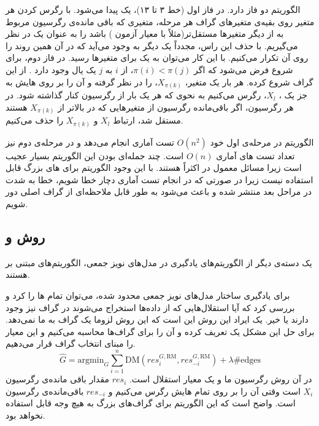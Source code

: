 \documentclass[a4paper,12pt]{article}
\def\hat{\widehat}
\begin{document}
الگوریتم 
دو فاز دارد. در فاز اول (خط ۳ تا ۱۳)، یک 	 پیدا می‌شود. با رگرس کردن هر متغیر روی بقیه‌ی متغیر‌های گراف هر مرحله، متغیری که باقی مانده‌ی رگرسیون مربوط به از دیگر متغیرها مستقل‌تر(مثلاً با معیار 
آزمون 
) باشد را به عنوان یک  
در نظر می‌گیریم. با حذف این راس، مجدداً یک
دیگر به وجود می‌آید که در آن همین روند را روی آن تکرار می‌کنیم. با این کار می‌توان به یک 
برای متغیرها رسید.
در فاز دوم، برای شروع  فرض می‌شود که اگر
$\pi(i) < \pi(j)$،
از $i$ به $j$ یک یال وجود دارد . از این گراف شروع کرده. هر بار یک متغیر،
$X_{\pi(k)}$،
را در نظر گرفته و آن را بر روی 
هایش به جز یک 
،
$X_l$،
رگرس می‌کنیم به نحوی که هر 
یک بار از رگرسیون کنار گذاشته شود. در هر رگرسیون، اگر باقی‌مانده رگرسیون از متغیر‌هایی که در 
بالاتر از 
$X_{\pi(k)}$
هستند مستقل شد، ارتباط $X_l$ و $X_{\pi(k)}$ را حذف می‌کنیم. 

الگوریتم 
در مرحله‌ی اول خود 
$O(n^2)$
تست آماری انجام می‌دهد و در مرحله‌ی دوم نیز تعداد تست های آماری
$O(n)$
است. چند جمله‌ای بودن این الگوریتم بسیار عجیب است زیرا مسائل معمول در 
اکثراً 
هستند. با این وجود الگوریتم 
برای  های بزرگ قابل استفاده نیست زیرا در صورتی که در انجام تست آماری دچار خطا شویم، خطا به شدت در مراحل بعد منتشر شده و باعث می‌شود به طور قابل ملاحظه‌ای از گراف اصلی دور شویم. 
\subsection{روش
	و 
}
یک دسته‌ی دیگر از الگوریتم‌های یادگیری در مدل‌های نویز جمعی، الگوریتم‌های مبتنی بر 
هستند. 

برای یادگیری ساختار مدل‌های نویز جمعی محدود شده، ‌می‌توان تمام
ها را 
کرد و بررسی کرد که آیا  استقلال‌هایی که از داده‌ها استخراج می‌شوند در گراف نیز وجود دارند  یا خیر. یک ایراد این روش  این است که این روش لزوما یک گراف
به ما نمی‌دهد. برای حل این مشکل یک 
تعریف کرده و آن را برای گراف‌ها محاسبه می‌کنیم و این معیار را مبنای انتخاب گراف قرار می‌دهیم.
$$\hat{G} = \mathrm{argmin}_G \sum_{i=1}^n \mathrm{DM}(res_i^{G, \mathrm{RM}}, res_{-i}^{G, \mathrm{RM}}) + \lambda \#\mathrm{edges}$$
در آن 
روش رگرسیون ما و 
یک معیار استقلال است.
$res_i$
مقدار باقی مانده‌ی رگرسیون $X_i$ است وقتی آن را بر روی تمام 
هایش رگرس می‌کنیم و 
$res_{-i}$
باقی‌مانده‌ی رگرسیون است. واضح است که این الگوریتم برای گراف‌های بزرگ به هیچ وجه قابل استفاده نخواهد بود.
\end{document}
